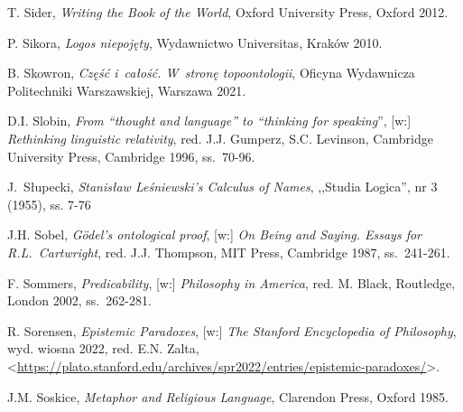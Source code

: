 \begin{thebibliography}{100}
T. Sider, \textit{Writing the Book of the World}, Oxford University Press, Oxford 2012.

P. Sikora, \textit{Logos niepojęty}, Wydawnictwo Universitas, Kraków 2010.


B. Skowron, \textit{Część i~całość. W~stronę topoontologii}, Oficyna Wydawnicza Politechniki Warszawskiej, Warszawa 2021.

D.I. Slobin, \textit{From ``thought and language'' to ``thinking for speaking}'', [w:] \textit{Rethinking linguistic relativity},
red. J.J. Gumperz, S.C. Levinson, Cambridge University Press, Cambridge 1996, ss.~70-96.

J.~Słupecki, \textit{Stanisław Leśniewski’s Calculus of Names}, ,,Studia Logica'', nr 3 (1955), ss. 7-76


J.H. Sobel, \textit{Gödel's ontological proof}, [w:] \textit{On Being and Saying. Essays for R.L.~Cartwright}, red. J.J. Thompson, MIT Press, Cambridge 1987, ss.~241-261.

F. Sommers, \textit{Predicability}, [w:] \textit{Philosophy in America}, red. M. Black, Routledge, London 2002, ss.~262-281.


R. Sorensen, \textit{Epistemic Paradoxes}, [w:] \textit{The Stanford Encyclopedia of Philosophy},
wyd. wiosna 2022, red. E.N. Zalta, <\url{https://plato.stanford.edu/archives/spr2022/entries/epistemic-paradoxes/}>.

J.M. Soskice, \textit{Metaphor and Religious Language}, Clarendon Press, Oxford 1985.


\end{thebibliography}
